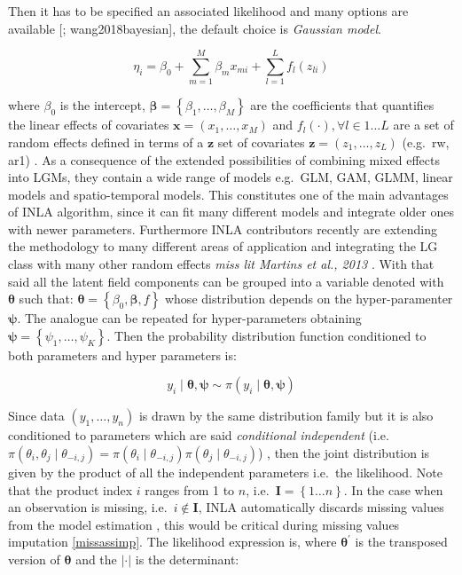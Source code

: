 \documentclass[
  12pt,
  a4paper,
  oneside]{book}
\theoremstyle{definition}
\theoremstyle{definition}
\theoremstyle{definition}
\theoremstyle{remark}
\begin{document}
Then it has to be specified an associated likelihood and many options are available {[}\citet{Bayesian_INLA_Rubio}; wang2018bayesian{]}, the default choice is \emph{Gaussian model}.

\[
\eta_{i}=\beta_{0}+\sum_{m=1}^{M} \beta_{m} x_{m i}+\sum_{l=1}^{L} f_{l}\left(z_{l i}\right)
\]

where \(\beta_{0}\) is the intercept, \(\boldsymbol{\beta}=\left\{\beta_{1}, \ldots, \beta_{M}\right\}\) are the coefficients that quantifies the linear effects of covariates \(\boldsymbol{x}=\left({x}_{1}, \ldots, {x}_{M}\right)\) and \(f_{l}(\cdot), \forall l \in 1 \ldots L\) are a set of random effects defined in terms of a \(\boldsymbol{z}\) set of covariates \(\boldsymbol{z}=\left(z_{1}, \ldots, z_{L}\right)\) (e.g.~rw, ar1) \citep{Blangiardo-Cameletti}. As a consequence of the extended possibilities of combining mixed effects into LGMs, they contain a wide range of models e.g.~GLM, GAM, GLMM, linear models and spatio-temporal models. This constitutes one of the main advantages of INLA algorithm, since it can fit many different models and integrate older ones with newer parameters. Furthermore INLA contributors recently are extending the methodology to many different areas of application and integrating the LG class with many other random effects \emph{miss lit Martins et al., 2013 }.
With that said all the latent field components can be grouped into a variable denoted with \(\boldsymbol{\theta}\) such that: \(\boldsymbol{\theta}=\left\{\beta_{0}, \boldsymbol{\beta}, f\right\}\) whose distribution depends on the hyper-paramenter \(\boldsymbol{\psi}\). The analogue can be repeated for hyper-parameters obtaining \(\boldsymbol{\psi} = \left\{\psi_{1}, \ldots, \psi_{K}\right\}\).
Then the probability distribution function conditioned to both parameters and hyper parameters is:

\[
y_{i} \mid \boldsymbol{\theta}, \boldsymbol{\psi} \sim \pi\left(y_{i} \mid \boldsymbol{\theta},\boldsymbol{\psi}\right)
\]

Since data \(\left(y_{1}, \ldots, y_{n}\right)\) is drawn by the same distribution family but it is also conditioned to parameters which are said \emph{conditional independent} \citep{GMRFRue} (i.e.~\(\pi\left(\theta_{i}, \theta_{j} \mid \theta_{-i, j}\right)=\pi\left(\theta_{i} \mid \theta_{-i, j}\right) \pi\left(\theta_{j} \mid \theta_{-i, j}\right)\)) , then the joint distribution is given by the product of all the independent parameters i.e.~the likelihood. Note that the product index \(i\) ranges from 1 to \(n\), i.e.~\(\mathbf{I} = \left\{1 \ldots n \right\}\).
In the case when an observation is missing, i.e.~\(i \notin \mathbf{I}\), INLA automatically discards missing values from the model estimation \citeyearpar{Bayesian_INLA_Rubio}, this would be critical during missing values imputation \ref{missassimp}.
The likelihood expression is, where \(\boldsymbol\theta^{\prime}\) is the transposed version of \(\boldsymbol\theta\) and the \(|\cdot|\) is the determinant:
\end{document}
